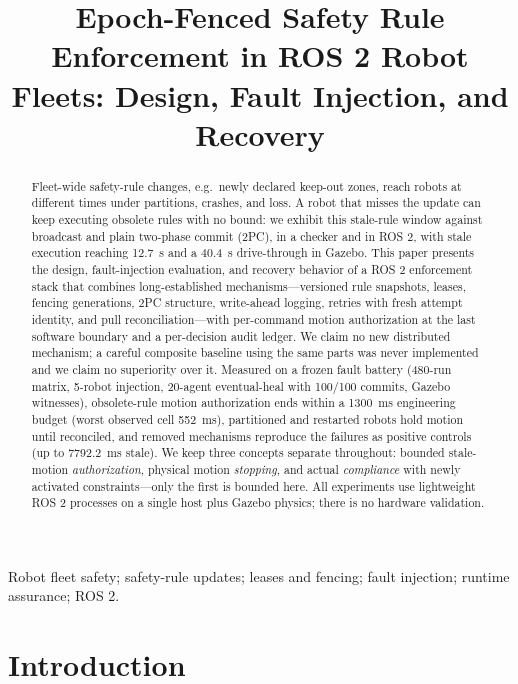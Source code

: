 \documentclass[10pt,journal]{IEEEtran}
\begin{document}
\title{Epoch-Fenced Safety Rule Enforcement in ROS 2 Robot Fleets:
Design, Fault Injection, and Recovery}

\author{} %

\maketitle

\begin{abstract}
Fleet-wide safety-rule changes, e.g.\ newly declared keep-out zones,
reach robots at different times under partitions, crashes, and loss.
A robot that misses the update can keep executing obsolete rules with
no bound: we exhibit this stale-rule window against broadcast and
plain two-phase commit (2PC), in a checker and in ROS 2, with stale
execution reaching 12.7~s and a 40.4~s drive-through in Gazebo.
This paper presents the design, fault-injection evaluation, and
recovery behavior of a ROS 2 enforcement stack that combines
long-established mechanisms---versioned rule snapshots, leases,
fencing generations, 2PC structure, write-ahead logging, retries
with fresh attempt identity, and pull reconciliation---with
per-command motion authorization at the last software boundary and a
per-decision audit ledger. We claim no new distributed mechanism; a
careful composite baseline using the same parts was never implemented
and we claim no superiority over it. Measured on a frozen fault
battery (480-run matrix, 5-robot injection, 20-agent eventual-heal
with 100/100 commits, Gazebo witnesses), obsolete-rule motion
authorization ends within a 1300~ms engineering budget (worst
observed cell 552~ms), partitioned and restarted robots hold motion
until reconciled, and removed mechanisms reproduce the failures as
positive controls (up to 7792.2~ms stale). We keep three concepts
separate throughout: bounded stale-motion \emph{authorization},
physical motion \emph{stopping}, and actual \emph{compliance} with
newly activated constraints---only the first is bounded here. All
experiments use lightweight ROS 2 processes on a single host plus
Gazebo physics; there is no hardware validation.
\end{abstract}

\begin{IEEEkeywords}
Robot fleet safety; safety-rule updates; leases and fencing;
fault injection; runtime assurance; ROS 2.
\end{IEEEkeywords}

\section{Introduction}
\label{sec:intro}
\end{document}
